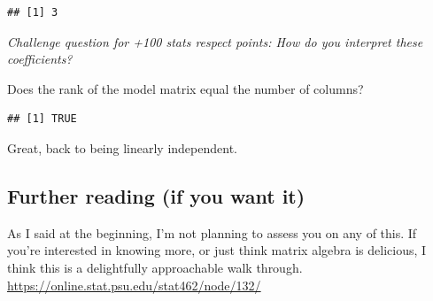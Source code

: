 \documentclass[
  openany]{book}
\begin{document}
\begin{verbatim}
## [1] 3
\end{verbatim}

\emph{Challenge question for +100 stats respect points: How do you interpret these coefficients?}

Does the rank of the model matrix equal the number of columns?

\begin{verbatim}
## [1] TRUE
\end{verbatim}

Great, back to being linearly independent.

\hypertarget{further-reading-if-you-want-it}{%
\subsection{Further reading (if you want it)}\label{further-reading-if-you-want-it}}

As I said at the beginning, I'm not planning to assess you on any of this. If you're interested in knowing more, or just think matrix algebra is delicious, I think this is a delightfully approachable walk through. \url{https://online.stat.psu.edu/stat462/node/132/}

  
\end{document}
